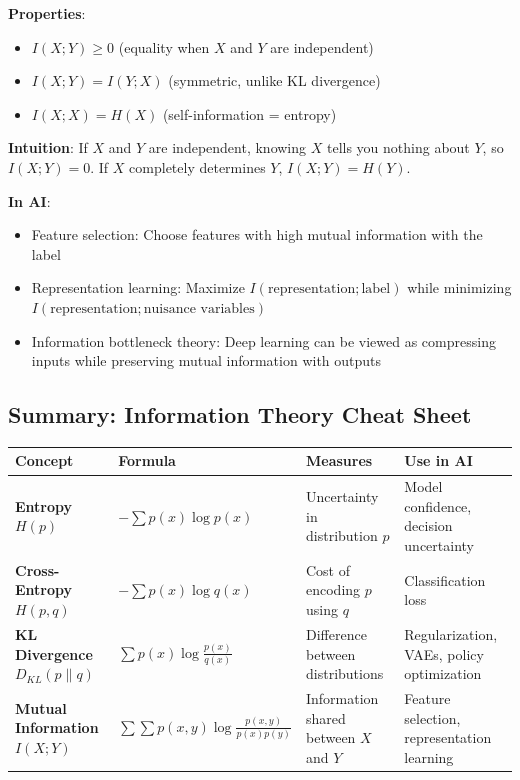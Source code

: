 \documentclass[11pt,oneside]{book}
\begin{document}
\textbf{Properties}:
\begin{itemize}
\item $I(X; Y) \geq 0$ (equality when $X$ and $Y$ are independent)
\item $I(X; Y) = I(Y; X)$ (symmetric, unlike KL divergence)
\item $I(X; X) = H(X)$ (self-information = entropy)
\end{itemize}

\textbf{Intuition}: If $X$ and $Y$ are independent, knowing $X$ tells you nothing about $Y$, so $I(X; Y) = 0$. If $X$ completely determines $Y$, $I(X; Y) = H(Y)$.

\textbf{In AI}:
\begin{itemize}
\item Feature selection: Choose features with high mutual information with the label
\item Representation learning: Maximize $I(\text{representation}; \text{label})$ while minimizing $I(\text{representation}; \text{nuisance variables})$
\item Information bottleneck theory: Deep learning can be viewed as compressing inputs while preserving mutual information with outputs
\end{itemize}

\subsection{Summary: Information Theory Cheat Sheet}

\begin{center}
\begin{tabular}{|l|l|l|l|}
\hline
\textbf{Concept} & \textbf{Formula} & \textbf{Measures} & \textbf{Use in AI} \\
\hline
\textbf{Entropy $H(p)$} & $-\sum p(x) \log p(x)$ & \parbox{3cm}{Uncertainty in distribution $p$} & \parbox{3.5cm}{Model confidence, decision uncertainty} \\
\hline
\textbf{Cross-Entropy $H(p,q)$} & $-\sum p(x) \log q(x)$ & \parbox{3cm}{Cost of encoding $p$ using $q$} & Classification loss \\
\hline
\textbf{KL Divergence $D_{KL}(p\|q)$} & $\sum p(x) \log\frac{p(x)}{q(x)}$ & \parbox{3cm}{Difference between distributions} & \parbox{3.5cm}{Regularization, VAEs, policy optimization} \\
\hline
\textbf{Mutual Information $I(X;Y)$} & $\sum\sum p(x,y) \log\frac{p(x,y)}{p(x)p(y)}$ & \parbox{3cm}{Information shared between $X$ and $Y$} & \parbox{3.5cm}{Feature selection, representation learning} \\
\hline
\end{tabular}
\end{center}
\end{document}
